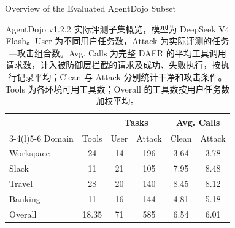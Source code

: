 \documentclass[UTF8]{ctexart}
\begin{document}
\begin{table}[ht]\centering
{\large Overview of the Evaluated AgentDojo Subset}\par\medskip
\renewcommand{\arraystretch}{1.25}
\begin{tabular*}{.98\linewidth}{@{\extracolsep{\fill}}lccccc@{}}
\toprule
 & & \multicolumn{2}{c}{Tasks} & \multicolumn{2}{c}{Avg. Calls} \\
\cmidrule(lr){3-4}\cmidrule(l){5-6}
Domain & Tools & User & Attack & Clean & Attack \\
\midrule
Workspace & 24 & 14 & 196 & 3.64 & 3.78 \\
Slack & 11 & 21 & 105 & 7.95 & 8.48 \\
Travel & 28 & 20 & 140 & 8.45 & 8.12 \\
Banking & 11 & 16 & 144 & 4.81 & 5.18 \\
\midrule
Overall & 18.35 & 71 & 585 & 6.54 & 6.01 \\
\bottomrule\end{tabular*}
\caption{AgentDojo v1.2.2 实际评测子集概览，模型为 DeepSeek V4 Flash。User 为不同用户任务数，Attack 为实际评测的任务—攻击组合数。Avg. Calls 为完整 DAFR 的平均工具调用请求数，计入被防御层拦截的请求及成功、失败执行，按执行记录平均；Clean 与 Attack 分别统计干净和攻击条件。Tools 为各环境可用工具数；Overall 的工具数按用户任务数加权平均。}
\end{table}
\end{document}
